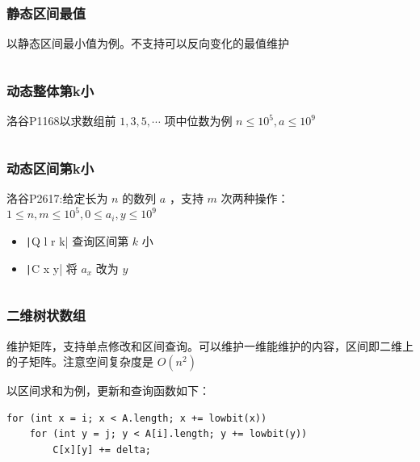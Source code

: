 \documentclass[twocolumn,10pt]{ctexart}
\begin{document}
\subsubsection{静态区间最值}

以静态区间最小值为例。不支持可以反向变化的最值维护

\inputminted{cpp}{code/ext_022.cpp}

\subsubsection{动态整体第k小}

\begin{notebox}
洛谷P1168以求数组前 $1,3,5,\cdots$ 项中位数为例 $n\le10^5,a\le10^9$
\end{notebox}

\inputminted{cpp}{code/ext_023.cpp}

\subsubsection{动态区间第k小}

\begin{notebox}
洛谷P2617:给定长为 $n$ 的数列 $a$ ，支持 $m$ 次两种操作：$1\le n,\allowbreak{}m\le10^5,\allowbreak{}0\le a_i,\allowbreak{}y\le10^9$

\begin{itemize}
\item \texttt|Q l r k| 查询区间第 $k$ 小
\item \texttt|C x y| 将 $a_x$ 改为 $y$
\end{itemize}
\end{notebox}

\inputminted{cpp}{code/p2617_presist_seg_on_fenwick.cpp}

\subsubsection{二维树状数组}

维护矩阵，支持单点修改和区间查询。可以维护一维能维护的内容，区间即二维上的子矩阵。注意空间复杂度是 $O(n^2)$

以区间求和为例，更新和查询函数如下：

\begin{verbatim}
for (int x = i; x < A.length; x += lowbit(x))
    for (int y = j; y < A[i].length; y += lowbit(y))
        C[x][y] += delta;
\end{verbatim}
\end{document}
